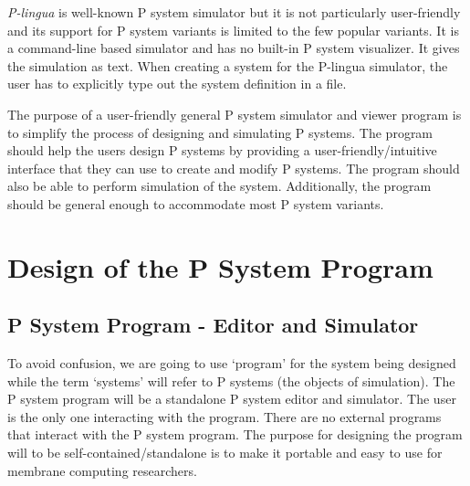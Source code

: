 \documentclass{article}
\begin{document}
\textit{P-lingua} is well-known P system simulator but it is not particularly user-friendly and its
support for P system variants is limited to the few popular variants. It is a command-line based
simulator and has no built-in P system visualizer. It gives the simulation as text. When creating a
system for the P-lingua simulator, the user has to explicitly type out the system definition in a 
file.

The purpose of a user-friendly general P system simulator and viewer program is to simplify the 
process of designing and simulating P systems. The program should help the users design P systems 
by providing a user-friendly/intuitive interface that they can use to create and modify P systems.
The program should also be able to perform simulation of the system. Additionally, the program 
should be general enough to accommodate most P system variants.



\section{Design of the P System Program}\label{s-design}


\subsection{P System Program - Editor and Simulator}\label{s-context}

To avoid confusion, we are going to use `program' for the system being designed while the term 
`systems' will refer to P systems (the objects of simulation). The P system program will be a 
standalone P system editor and simulator. The user is the only one interacting with the program. 
There are no external programs that interact with the P system program. The purpose for designing
the program will to be self-contained/standalone is to make it portable and easy to use for 
membrane computing researchers.  
\end{document}
